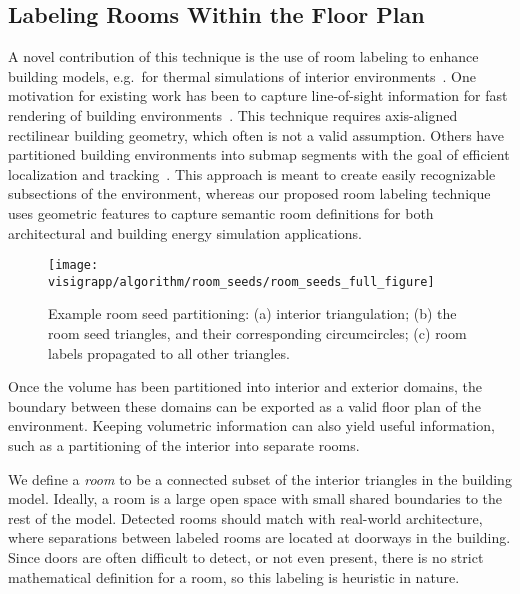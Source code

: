\documentclass[12pt,onecolumn,oneside]{book}
\begin{document}
\subsection{Labeling Rooms Within the Floor Plan}
\label{ssec:room_label}

A novel contribution of this technique is the use of room labeling to enhance building models, e.g.\ for thermal simulations of interior environments~\cite{Turner14,EnergyPlus}.  One motivation for existing work has been to capture line-of-sight information for fast rendering of building environments~\cite{WalkthroughRendering}.  This technique requires axis-aligned rectilinear building geometry, which often is not a valid assumption.  Others have partitioned building environments into submap segments with the goal of efficient localization and tracking~\cite{SpectralClustering}.  This approach is meant to create easily recognizable subsections of the environment, whereas our proposed room labeling technique uses geometric features to capture semantic room definitions for both architectural and building energy simulation applications.

\begin{figure}[t]
  \centering
  \texttt{[image: visigrapp/algorithm/room\_seeds/room\_seeds\_full\_figure]}
  \caption[Example room seed partitioning.]{Example room seed partitioning: (a) interior triangulation; (b) the room seed triangles, and their corresponding circumcircles; (c) room labels propagated to all other triangles.}
  \label{fig:roomlabeling}
\end{figure}

Once the volume has been partitioned into interior and exterior domains, the boundary between these domains can be exported as a valid floor plan of the environment.  Keeping volumetric information can also yield useful information, such as a partitioning of the interior into separate rooms.

We define a {\it room} to be a connected subset of the interior triangles in the building model.  Ideally, a room is a large open space with small shared boundaries to the rest of the model.  Detected rooms should match with real-world architecture, where separations between labeled rooms are located at doorways in the building.  Since doors are often difficult to detect, or not even present, there is no strict mathematical definition for a room, so this labeling is heuristic in nature.
\end{document}
